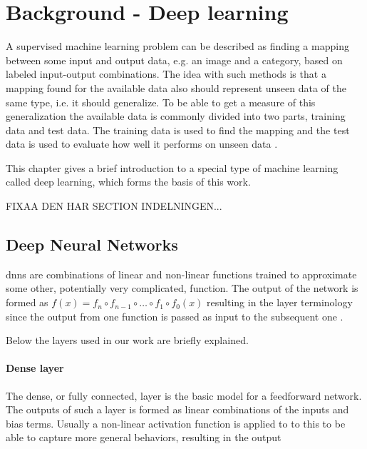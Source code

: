 \chapter{Background - Deep learning} \label{ch:dl}

A supervised machine learning problem can be described as finding a mapping between some input and output data, e.g. an image and a category, based on labeled input-output combinations. The idea with such methods is that a mapping found for the available data also should represent unseen data of the same type, i.e. it should generalize. To be able to get a measure of this generalization the available data is commonly divided into two parts, training data and test data. The training data is used to find the mapping and the test data is used to evaluate how well it performs on unseen data \cite{Bishop2006}.

This chapter gives a brief introduction to a special type of machine learning called deep learning, which forms the basis of this work.

FIXAA DEN HAR SECTION INDELNINGEN...
\section{Deep Neural Networks}
\glspl{dnn} are combinations of linear and non-linear functions trained to approximate some other, potentially very complicated, function. The output of the network is formed as $f(x) = f_n \circ f_{n-1} \circ \hdots \circ f_1 \circ f_0(x)$ resulting in the layer terminology since the output from one function is passed as input to the subsequent one \cite{Goodfellow2016}.

Below the layers used in our work are briefly explained.

\subsubsection{Dense layer}
The dense, or fully connected, layer is the basic model for a feedforward network. The outputs of such a layer is formed as linear combinations of the inputs and bias terms. Usually a non-linear activation function is applied to to this to be able to capture more general behaviors, resulting in the output

